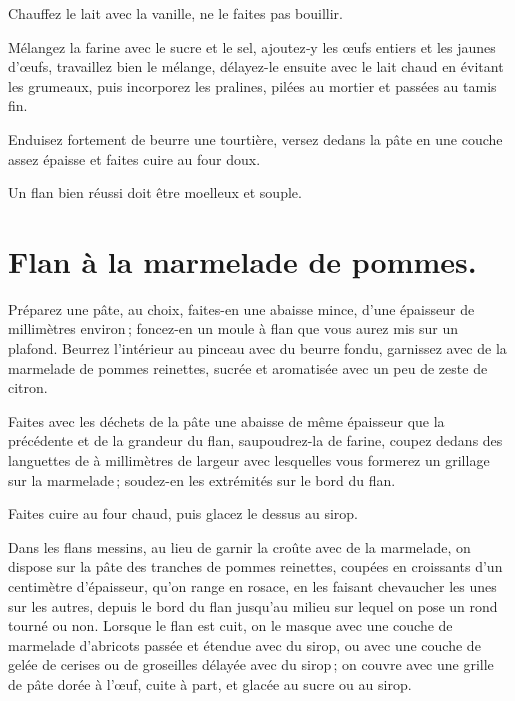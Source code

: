 Chauffez le lait avec la vanille, ne le faites pas bouillir.

Mélangez la farine avec le sucre et le sel, ajoutez‑y les œufs entiers et les
jaunes d'œufs, travaillez bien le mélange, délayez-le ensuite avec le lait
chaud en évitant les grumeaux, puis incorporez les pralines, pilées au mortier
et passées au tamis fin.

Enduisez fortement de beurre une tourtière, versez dedans la pâte en une
couche assez épaisse et faites cuire au four doux.

Un flan bien réussi doit être moelleux et souple.

\section*{\centering Flan à la marmelade de pommes.}
{}

Préparez une pâte, au choix, faites-en une abaisse mince, d'une épaisseur de
{\mmm} millimètres environ ; foncez-en un moule à flan que vous aurez mis
sur un plafond. Beurrez l'intérieur au pinceau avec du beurre fondu, garnissez
avec de la marmelade de pommes reinettes, sucrée et aromatisée avec un peu de
zeste de citron.

Faites avec les déchets de la pâte une abaisse de même épaisseur que la
précédente et de la grandeur du flan, saupoudrez-la de farine, coupez dedans
des languettes de {\mmm} à {\mmm} millimètres de largeur avec
lesquelles vous formerez un grillage sur la marmelade ; soudez-en les
extrémités sur le bord du flan.

Faites cuire au four chaud, puis glacez le dessus au sirop.

\sk

Dans les flans messins, au lieu de garnir la croûte avec de la marmelade, on
dispose sur la pâte des tranches de pommes reinettes, coupées en croissants
d'un centimètre d'épaisseur, qu'on range en rosace, en les faisant chevaucher
les unes sur les autres, depuis le bord du flan jusqu’au milieu sur lequel on
pose un rond tourné ou non. Lorsque le flan est cuit, on le masque avec une
couche de marmelade d'abricots passée et étendue avec du sirop, ou avec une
couche de gelée de cerises ou de groseilles délayée avec du sirop ; on couvre
avec une grille de pâte dorée à l'œuf, cuite à part, et glacée au sucre ou au
sirop.

\sk

